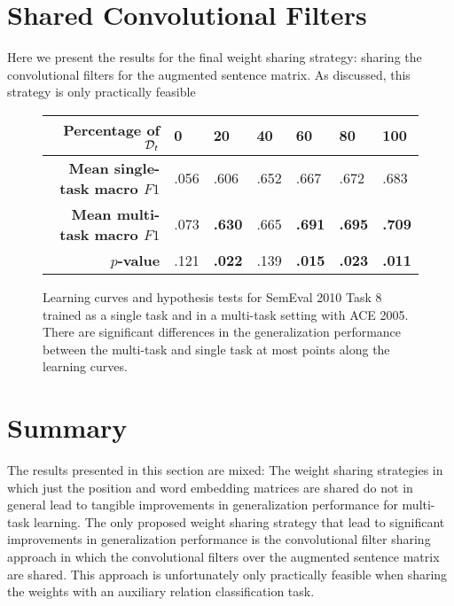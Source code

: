 \section{Shared Convolutional Filters}
Here we present the results for the final weight sharing strategy: sharing the convolutional filters for the augmented sentence matrix. As discussed, this strategy is only practically feasible 
\begin{figure}[h]
	\centering
	
		\vspace*{1cm}
	
	\begin{tabular}{r | l | l | l | l | l | l}
		\textbf{Percentage of $\mathcal{D}_t$} & 0 & 20 & 40 & 60 & 80 & 100 \\  \hline
		\textbf{Mean single-task macro $F1$} & .056 & .606 & .652 & .667 & .672 & .683\\
		\textbf{Mean multi-task macro $F1$} & .073 & \textbf{.630} & .665 & \textbf{.691} & \textbf{.695} & \textbf{.709}\\
		$p$\textbf{-value} & .121 & \textbf{.022} & .139 & \textbf{.015} & \textbf{.023} &\textbf{.011}
	\end{tabular}
	\caption{Learning curves and hypothesis tests for SemEval 2010 Task 8 trained as a single task and in a multi-task setting with ACE 2005. There are significant differences in the generalization performance between the multi-task and single task at most points along the learning curves.}
\end{figure}



\section{Summary}
The results presented in this section are mixed: The weight sharing strategies in which just the position and word embedding matrices are shared do not in general lead to tangible improvements in generalization performance for multi-task learning. The only proposed weight sharing strategy that lead to significant improvements in generalization performance is the convolutional filter sharing approach in which the convolutional filters over the augmented sentence matrix are shared. This approach is unfortunately only practically feasible when sharing the weights with an auxiliary relation classification task.